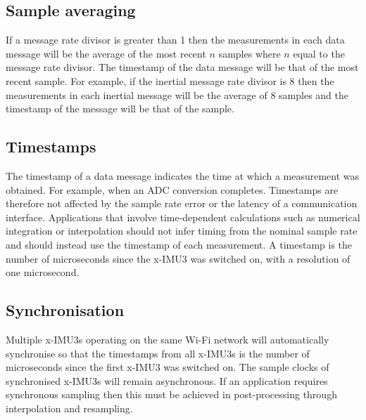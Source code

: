 \subsection{Sample averaging}

If a message rate divisor is greater than 1 then the measurements in each data message will be the average of the most recent $n$ samples where $n$ equal to the message rate divisor.  The timestamp of the data message will be that of the most recent sample.  For example, if the inertial message rate divisor is 8 then the measurements in each inertial message will be the average of 8 samples and the timestamp of the message will be that of the  sample.

\subsection{Timestamps}

The timestamp of a data message indicates the time at which a measurement was obtained.  For example, when an \ac{ADC} conversion completes.  Timestamps are therefore not affected by the sample rate error or the latency of a communication interface.  Applications that involve time-dependent calculations such as numerical integration or interpolation should not infer timing from the nominal sample rate and should instead use the timestamp of each measurement.  A timestamp is the number of microseconds since the x-IMU3 was switched on, with a resolution of one microsecond.

\subsection{Synchronisation}
\label{sec:synchronisation}

Multiple x-IMU3s operating on the same Wi-Fi network will automatically synchronise so that the timestamps from all x-IMU3s is the number of microseconds since the first x-IMU3 was switched on.  The sample clocks of synchronised x-IMU3s will remain asynchronous.  If an application requires synchronous sampling then this must be achieved in post-processing through interpolation and resampling.
